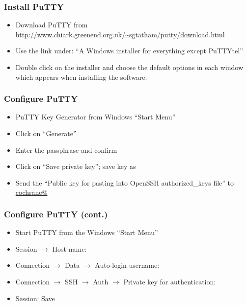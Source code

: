 \begin{frame}
    \frametitle{Install PuTTY}

    \begin{itemize}
        \item Download PuTTY from
            \url{http://www.chiark.greenend.org.uk/~sgtatham/putty/download.html}
        \item Use the link under:
            \enquote{A Windows installer for everything except PuTTYtel}
        \item Double click on the installer and choose the default options
            in each window which appears when installing the software.
    \end{itemize}
\end{frame}

\begin{frame}[fragile]
    \frametitle{Configure PuTTY}

    \begin{itemize}
        \item PuTTY Key Generator from Windows \enquote{Start Menu}
        \item Click on \enquote{Generate}
        \item Enter the passphrase and confirm
        \item Click on \enquote{Save private key}; save key as 
        \item Send the \enquote{Public key for pasting into OpenSSH
            authorized\_keys file} to \url{cochrane@}
    \end{itemize}
\end{frame}

\begin{frame}[fragile]
    \frametitle{Configure PuTTY (cont.)}

    \begin{itemize}
        \item Start PuTTY from the Windows \enquote{Start Menu}
        \item Session $\rightarrow$
            Host name: 
        \item Connection $\rightarrow$ Data $\rightarrow$ Auto-login
            username: 
        \item Connection $\rightarrow$ SSH $\rightarrow$ Auth $\rightarrow$
            Private key for authentication: 
        \item Session: Save
    \end{itemize}
\end{frame}

